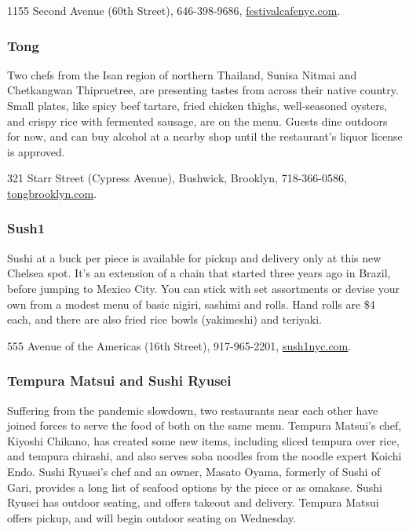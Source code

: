 1155 Second Avenue (60th Street), 646-398-9686,
\href{https://www.festivalcafenyc.com/}{festivalcafenyc.com}.

\hypertarget{tong}{%
\subsubsection{Tong}\label{tong}}

Two chefs from the Isan region of northern Thailand, Sunisa Nitmai and
Chetkangwan Thipruetree, are presenting tastes from across their native
country. Small plates, like spicy beef tartare, fried chicken thighs,
well-seasoned oysters, and crispy rice with fermented sausage, are on
the menu. Guests dine outdoors for now, and can buy alcohol at a nearby
shop until the restaurant's liquor license is approved.

321 Starr Street (Cypress Avenue), Bushwick, Brooklyn, 718-366-0586,
\href{http://tongbrooklyn.com/}{tongbrooklyn.com}.

\hypertarget{sush1}{%
\subsubsection{Sush1}\label{sush1}}

Sushi at a buck per piece is available for pickup and delivery only at
this new Chelsea spot. It's an extension of a chain that started three
years ago in Brazil, before jumping to Mexico City. You can stick with
set assortments or devise your own from a modest menu of basic nigiri,
sashimi and rolls. Hand rolls are \$4 each, and there are also fried
rice bowls (yakimeshi) and teriyaki.

555 Avenue of the Americas (16th Street), 917-965-2201,
\href{http://sush1nyc.com/}{sush1nyc.com}.

\hypertarget{tempura-matsui-and-sushi-ryusei}{%
\subsubsection{Tempura Matsui and Sushi
Ryusei}\label{tempura-matsui-and-sushi-ryusei}}

Suffering from the pandemic slowdown, two restaurants near each other
have joined forces to serve the food of both on the same menu. Tempura
Matsui's chef, Kiyoshi Chikano, has created some new items, including
sliced tempura over rice, and tempura chirashi, and also serves soba
noodles from the noodle expert Koichi Endo. Sushi Ryusei's chef and an
owner, Masato Oyama, formerly of Sushi of Gari, provides a long list of
seafood options by the piece or as omakase. Sushi Ryusei has outdoor
seating, and offers takeout and delivery. Tempura Matsui offers pickup,
and will begin outdoor seating on Wednesday.


